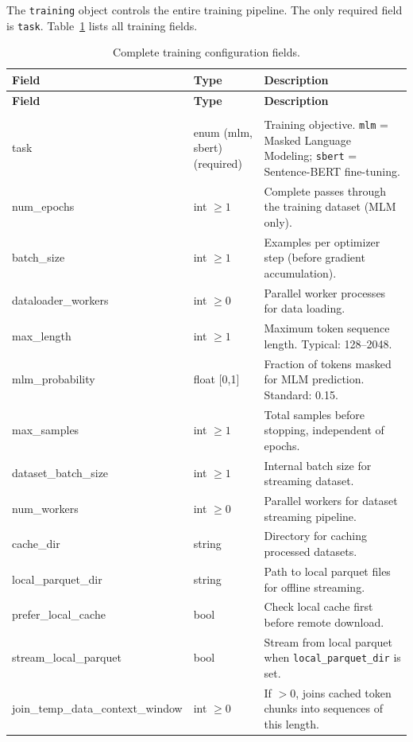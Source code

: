 The \texttt{training} object controls the entire training pipeline. The only required field is \texttt{task}. Table~\ref{tab:training-fields} lists all training fields.

\begin{longtable}{>{\ttfamily}l>{\raggedright\arraybackslash}p{3.5cm}>{\raggedright\arraybackslash}p{8.5cm}}
\toprule
\textbf{Field} & \textbf{Type} & \textbf{Description} \\
\midrule
\endfirsthead
\toprule
\textbf{Field} & \textbf{Type} & \textbf{Description} \\
\midrule
\endhead
\midrule
\multicolumn{3}{r}{\textit{continued on next page}} \\
\endfoot
\bottomrule
\caption{Complete training configuration fields.}
\label{tab:training-fields}
\endlastfoot
task & enum (mlm, sbert) (required) & Training objective. \texttt{mlm} = Masked Language Modeling; \texttt{sbert} = Sentence-BERT fine-tuning. \\
num\_epochs & int $\ge 1$ & Complete passes through the training dataset (MLM only). \\
batch\_size & int $\ge 1$ & Examples per optimizer step (before gradient accumulation). \\
dataloader\_workers & int $\ge 0$ & Parallel worker processes for data loading. \\
max\_length & int $\ge 1$ & Maximum token sequence length. Typical: 128--2048. \\
mlm\_probability & float [0,1] & Fraction of tokens masked for MLM prediction. Standard: 0.15. \\
max\_samples & int $\ge 1$ & Total samples before stopping, independent of epochs. \\
dataset\_batch\_size & int $\ge 1$ & Internal batch size for streaming dataset. \\
num\_workers & int $\ge 0$ & Parallel workers for dataset streaming pipeline. \\
cache\_dir & string & Directory for caching processed datasets. \\
local\_parquet\_dir & string & Path to local parquet files for offline streaming. \\
prefer\_local\_cache & bool & Check local cache first before remote download. \\
stream\_local\_parquet & bool & Stream from local parquet when \texttt{local\_parquet\_dir} is set. \\
join\_temp\_data\_context\_window & int $\ge 0$ & If $>0$, joins cached token chunks into sequences of this length. \\

\end{longtable}
